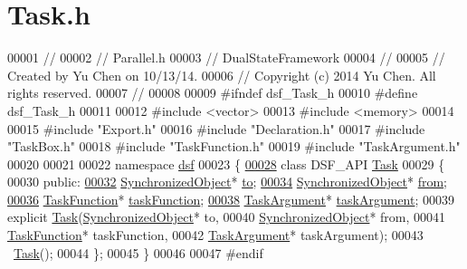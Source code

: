\hypertarget{_task_8h_source}{}\section{Task.\+h}
\label{_task_8h_source}

\begin{DoxyCode}
00001 \textcolor{comment}{//}
00002 \textcolor{comment}{//  Parallel.h}
00003 \textcolor{comment}{//  DualStateFramework}
00004 \textcolor{comment}{//}
00005 \textcolor{comment}{//  Created by Yu Chen on 10/13/14.}
00006 \textcolor{comment}{//  Copyright (c) 2014 Yu Chen. All rights reserved.}
00007 \textcolor{comment}{//}
00008 
00009 \textcolor{preprocessor}{#ifndef dsf\_Task\_h}
00010 \textcolor{preprocessor}{#define dsf\_Task\_h}
00011 
00012 \textcolor{preprocessor}{#include <vector>}
00013 \textcolor{preprocessor}{#include <memory>}
00014 
00015 \textcolor{preprocessor}{#include "Export.h"}
00016 \textcolor{preprocessor}{#include "Declaration.h"}
00017 \textcolor{preprocessor}{#include "TaskBox.h"}
00018 \textcolor{preprocessor}{#include "TaskFunction.h"}
00019 \textcolor{preprocessor}{#include "TaskArgument.h"}
00020 
00021 
00022 \textcolor{keyword}{namespace }\hyperlink{namespacedsf}{dsf}
00023 \{
\hypertarget{_task_8h_source_l00028}{}\hyperlink{classdsf_1_1_task}{00028}     \textcolor{keyword}{class }DSF\_API \hyperlink{classdsf_1_1_task}{Task}
00029     \{
00030     \textcolor{keyword}{public}:
\hypertarget{_task_8h_source_l00032}{}\hyperlink{classdsf_1_1_task_a36c485fbeb9c2330f5637b9d625cf01a}{00032}         \hyperlink{classdsf_1_1_synchronized_object}{SynchronizedObject}* \hyperlink{classdsf_1_1_task_a36c485fbeb9c2330f5637b9d625cf01a}{to};
\hypertarget{_task_8h_source_l00034}{}\hyperlink{classdsf_1_1_task_afc1faf30dab0d57501dfdcb4ef7b5450}{00034}         \hyperlink{classdsf_1_1_synchronized_object}{SynchronizedObject}* \hyperlink{classdsf_1_1_task_afc1faf30dab0d57501dfdcb4ef7b5450}{from};
\hypertarget{_task_8h_source_l00036}{}\hyperlink{classdsf_1_1_task_a681617cab34fbae641c5b0cf4be46659}{00036}         \hyperlink{namespacedsf_aa16e735f29587f4485b56fc46746f7a9}{TaskFunction}* \hyperlink{classdsf_1_1_task_a681617cab34fbae641c5b0cf4be46659}{taskFunction};
\hypertarget{_task_8h_source_l00038}{}\hyperlink{classdsf_1_1_task_a8a095d8a36668f6500d4df8c24dbef8d}{00038}         \hyperlink{namespacedsf_abe4bf68433935a81c31a5ada9b17663a}{TaskArgument}* \hyperlink{classdsf_1_1_task_a8a095d8a36668f6500d4df8c24dbef8d}{taskArgument};
00039         \textcolor{keyword}{explicit} \hyperlink{namespacedsf_a7df24c7d3d82e2e686aa3a524dc1dee9}{Task}(\hyperlink{classdsf_1_1_synchronized_object}{SynchronizedObject}* to,
00040              \hyperlink{classdsf_1_1_synchronized_object}{SynchronizedObject}* from,
00041              \hyperlink{namespacedsf_aa16e735f29587f4485b56fc46746f7a9}{TaskFunction}* taskFunction,
00042              \hyperlink{namespacedsf_abe4bf68433935a81c31a5ada9b17663a}{TaskArgument}* taskArgument);
00043         ~\hyperlink{classdsf_1_1_task}{Task}();
00044     \};
00045 \}
00046 
00047 \textcolor{preprocessor}{#endif}
\end{DoxyCode}
